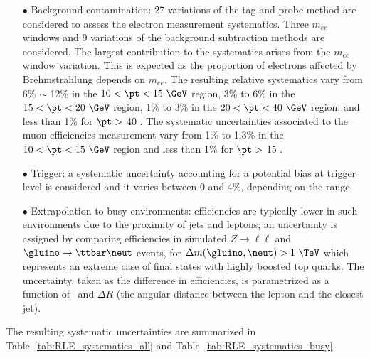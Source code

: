 \begin{itemize}
\item[$\bullet$] Background contamination: 27 variations of the tag-and-probe method are considered to assess the electron measurement systematics.
Three $m_{ee}$ windows and 9 variations of the background subtraction methods are considered.
The largest contribution to the systematics arises from the $m_{ee}$ window variation.
This is expected as the proportion of electrons affected by Brehmstrahlung depends on $m_{ee}$.
The resulting relative systematics vary from 6\% $\sim$ 12\% in the $10<\pt<15~\GeV$ region, 3\% to 6\% in the $15<\pt<20~\GeV$ region, 1\% to 3\% in the $20<\pt<40~\GeV$ region, and less than 1\% for $\pt >$ 40 \GeV.
The systematic uncertainties associated to the muon efficiencies measurement vary from 1\% to 1.3\% in the $10<\pt<15~\GeV$ region and less than 1\% for $\pt >$ 15 \GeV. 
\item[$\bullet$] Trigger: a systematic uncertainty accounting for a potential bias at trigger level is considered and it varies between 0 and 4\%, depending on the \pt range.
\item[$\bullet$] Extrapolation to busy environments: efficiencies are typically lower in such environments due to the proximity of jets and leptons; 
an uncertainty is assigned by comparing efficiencies in simulated $Z\to\ell\ell$ and $\gluino\to\ttbar\neut$ events, for $\Delta m(\gluino,\neut)>1~\TeV$ which represents an extreme case of final states with highly boosted top quarks. 
The uncertainty, taken as the difference in efficiencies, is parametrized as a function of \pt\ and $\Delta R$ (the angular distance between the lepton and the closest jet). 
\end{itemize}
The resulting systematic uncertainties are summarized in Table~\ref{tab:RLE_systematics_all} and Table~\ref{tab:RLE_systematics_busy}.


